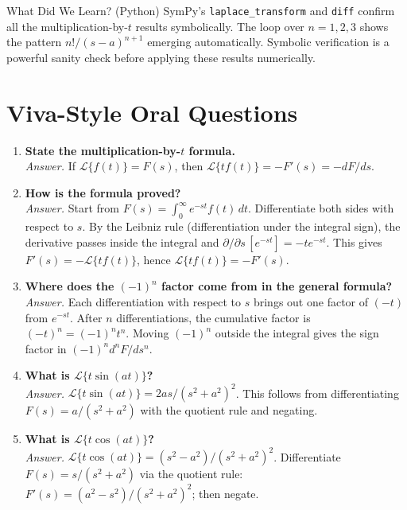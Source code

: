 \documentclass[12pt,a4paper]{article}
\begin{document}
\begin{learnbox}{What Did We Learn? (Python)}
SymPy's \texttt{laplace\_transform} and \texttt{diff} confirm all the
multiplication-by-$t$ results symbolically. The loop over $n=1,2,3$ shows the
pattern $n!/(s-a)^{n+1}$ emerging automatically. Symbolic verification is a
powerful sanity check before applying these results numerically.
\end{learnbox}

\section{Viva-Style Oral Questions}
\begin{enumerate}

\item \textbf{State the multiplication-by-$t$ formula.}\\
\textit{Answer.} If $\mathcal{L}\{f(t)\}=F(s)$, then
$\mathcal{L}\{tf(t)\}=-F'(s)=-dF/ds$.

\item \textbf{How is the formula proved?}\\
\textit{Answer.} Start from $F(s)=\int_0^\infty e^{-st}f(t)\,dt$. Differentiate
both sides with respect to $s$. By the Leibniz rule (differentiation under the
integral sign), the derivative passes inside the integral and $\partial/\partial
s\,[e^{-st}]=-te^{-st}$. This gives $F'(s)=-\mathcal{L}\{tf(t)\}$, hence
$\mathcal{L}\{tf(t)\}=-F'(s)$.

\item \textbf{Where does the $(-1)^n$ factor come from in the general formula?}\\
\textit{Answer.} Each differentiation with respect to $s$ brings out one factor
of $(-t)$ from $e^{-st}$. After $n$ differentiations, the cumulative factor is
$(-t)^n=(-1)^n t^n$. Moving $(-1)^n$ outside the integral gives the sign factor
in $(-1)^n d^n F/ds^n$.

\item \textbf{What is $\mathcal{L}\{t\sin(at)\}$?}\\
\textit{Answer.} $\mathcal{L}\{t\sin(at)\}=2as/(s^2+a^2)^2$. This follows from
differentiating $F(s)=a/(s^2+a^2)$ with the quotient rule and negating.

\item \textbf{What is $\mathcal{L}\{t\cos(at)\}$?}\\
\textit{Answer.} $\mathcal{L}\{t\cos(at)\}=(s^2-a^2)/(s^2+a^2)^2$. Differentiate
$F(s)=s/(s^2+a^2)$ via the quotient rule: $F'(s)=(a^2-s^2)/(s^2+a^2)^2$; then
negate.


\end{enumerate}
\end{document}

